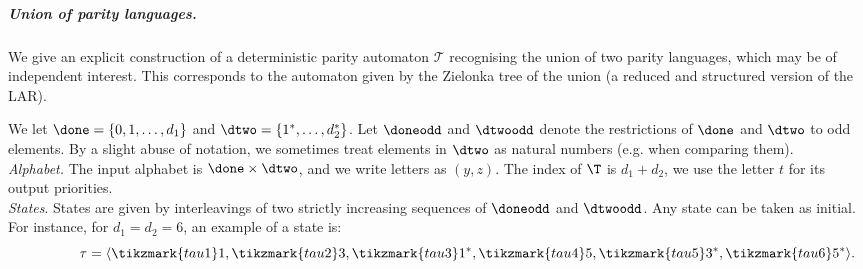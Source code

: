 \subparagraph{Union of parity languages.} We give an explicit construction of a deterministic parity automaton $\mathcal{T}$ recognising the union of two parity languages, which may be of independent interest.  This corresponds to the automaton given by the Zielonka tree of the union (a reduced and structured version of the LAR).

We let $\done = \{0, 1,\dots,d_1\}$  and $\dtwo= \{1^*,\dots,d_2^*\}$.
Let $\doneodd$ and $\dtwoodd$ denote the restrictions of $\done$ and $\dtwo$ to odd elements.
By a slight abuse of notation, we sometimes treat elements in $\dtwo$ as natural numbers (e.g. when comparing them).\\

\textit{Alphabet.} 
The input alphabet is $\done \times \dtwo$, and we write letters as $(y,z)$. 
The index of $\T$  is $d_1 + d_2$, we use the letter $t$ for its output priorities.\\


\textit{States}. 
States are given by interleavings of two strictly increasing sequences of $\doneodd$ and $\dtwoodd$. Any state can be taken as initial. For instance, for $d_1=d_2=6$, an example of a state is:\\[-4mm]
\[  \hspace{15mm} \tau = \langle \tikzmark{tau1}1,\tikzmark{tau2}3,\tikzmark{tau3}1^*,\tikzmark{tau4}5, \tikzmark{tau5}3^*, \tikzmark{tau6}5^* \rangle .\]



\vspace{-2.5mm}


